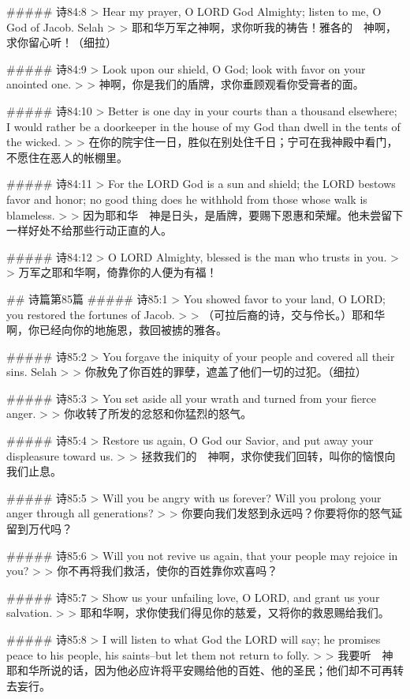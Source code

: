 ##### 诗84:8
> Hear my prayer, O LORD God Almighty; listen to me, O God of Jacob. Selah
>
> 耶和华万军之神啊，求你听我的祷告！雅各的　神啊，求你留心听！（细拉）


##### 诗84:9
> Look upon our shield, O God; look with favor on your anointed one.
>
> 神啊，你是我们的盾牌，求你垂顾观看你受膏者的面。


##### 诗84:10
> Better is one day in your courts than a thousand elsewhere; I would rather be a doorkeeper in the house of my God than dwell in the tents of the wicked.
>
> 在你的院宇住一日，胜似在别处住千日；宁可在我神殿中看门，不愿住在恶人的帐棚里。


##### 诗84:11
> For the LORD God is a sun and shield; the LORD bestows favor and honor; no good thing does he withhold from those whose walk is blameless.
>
> 因为耶和华　神是日头，是盾牌，要赐下恩惠和荣耀。他未尝留下一样好处不给那些行动正直的人。


##### 诗84:12
> O LORD Almighty, blessed is the man who trusts in you.
>
> 万军之耶和华啊，倚靠你的人便为有福！


## 诗篇第85篇
##### 诗85:1
> You showed favor to your land, O LORD; you restored the fortunes of Jacob.
>
> （可拉后裔的诗，交与伶长。）耶和华啊，你已经向你的地施恩，救回被掳的雅各。


##### 诗85:2
> You forgave the iniquity of your people and covered all their sins. Selah
>
> 你赦免了你百姓的罪孽，遮盖了他们一切的过犯。（细拉）


##### 诗85:3
> You set aside all your wrath and turned from your fierce anger.
>
> 你收转了所发的忿怒和你猛烈的怒气。


##### 诗85:4
> Restore us again, O God our Savior, and put away your displeasure toward us.
>
> 拯救我们的　神啊，求你使我们回转，叫你的恼恨向我们止息。


##### 诗85:5
> Will you be angry with us forever? Will you prolong your anger through all generations?
>
> 你要向我们发怒到永远吗？你要将你的怒气延留到万代吗？


##### 诗85:6
> Will you not revive us again, that your people may rejoice in you?
>
> 你不再将我们救活，使你的百姓靠你欢喜吗？


##### 诗85:7
> Show us your unfailing love, O LORD, and grant us your salvation.
>
> 耶和华啊，求你使我们得见你的慈爱，又将你的救恩赐给我们。


##### 诗85:8
> I will listen to what God the LORD will say; he promises peace to his people, his saints--but let them not return to folly.
>
> 我要听　神耶和华所说的话，因为他必应许将平安赐给他的百姓、他的圣民；他们却不可再转去妄行。


